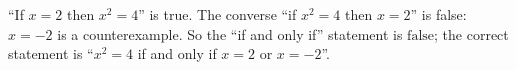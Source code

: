 ``If $x=2$ then $x^2=4$'' is true. The converse ``if $x^2=4$ then $x=2$'' is false: $x=-2$ is a counterexample. So the ``if and only if'' statement is $\boxed{\text{false}}$; the correct statement is ``$x^2=4$ if and only if $x=2$ or $x=-2$''.
